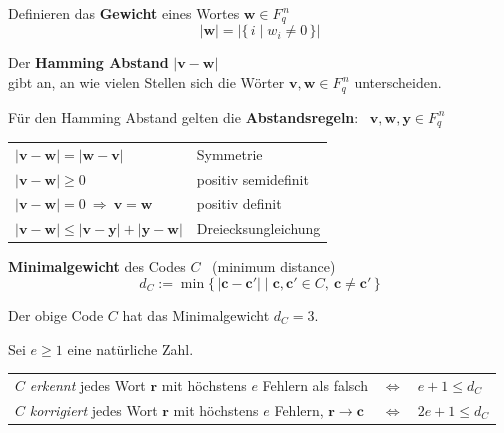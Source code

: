 \begin{definition}[Gewicht]
Definieren das \textbf{Gewicht} eines Wortes $\mathbf{w} \in F_q^{\,n}$
\[ |\mathbf{w}| = |\{\, i \mid w_i \neq 0 \,\}| \]
\end{definition}

\begin{definition}
Der \textbf{Hamming Abstand} \quad $|\mathbf{v}-\mathbf{w}|$\\
gibt an, an wie vielen Stellen sich die Wörter $\mathbf{v}, \mathbf{w} \in F_q^{\,n}$ unterscheiden.
\end{definition}

Für den Hamming Abstand gelten die \textbf{Abstandsregeln}: \ $\mathbf{v}, \mathbf{w}, \mathbf{y} \in F_q^{\,n}$
\begin{center}
\begin{tabular}{ll}
$|\mathbf{v}-\mathbf{w}| = |\mathbf{w}-\mathbf{v}|$ & Symmetrie \\
$|\mathbf{v}-\mathbf{w}| \geq 0$ & positiv semidefinit \\
$|\mathbf{v}-\mathbf{w}| = 0 \ \Rightarrow \ \mathbf{v} = \mathbf{w}$ & positiv definit \\
$|\mathbf{v}-\mathbf{w}| \leq |\mathbf{v}-\mathbf{y}| + |\mathbf{y}-\mathbf{w}|$ & Dreiecksungleichung \\
\end{tabular}
\end{center}

\begin{definition}[Minimalgewicht]
\textbf{Minimalgewicht} des Codes $C$ \ (minimum distance)
\[ d_C := \min\{\, |\mathbf{c} - \mathbf{c}'| \mid \mathbf{c}, \mathbf{c}' \in C,\ \mathbf{c} \neq \mathbf{c}' \,\} \]
\end{definition}

\begin{beispiel}
Der obige Code $C$ hat das Minimalgewicht $d_C = 3$.
\end{beispiel}

\begin{satz}
Sei $e \geq 1$ eine natürliche Zahl.\\
\begin{tabular}{lcl}
$C$ \textit{erkennt} jedes Wort $\mathbf{r}$ mit höchstens $e$ Fehlern als falsch & $\Leftrightarrow$ & $e + 1 \leq d_C$ \\
$C$ \textit{korrigiert} jedes Wort $\mathbf{r}$ mit höchstens $e$ Fehlern, $\mathbf{r} \to \mathbf{c}$ & $\Leftrightarrow$ & $2e + 1 \leq d_C$ \\
\end{tabular}
\end{satz}

